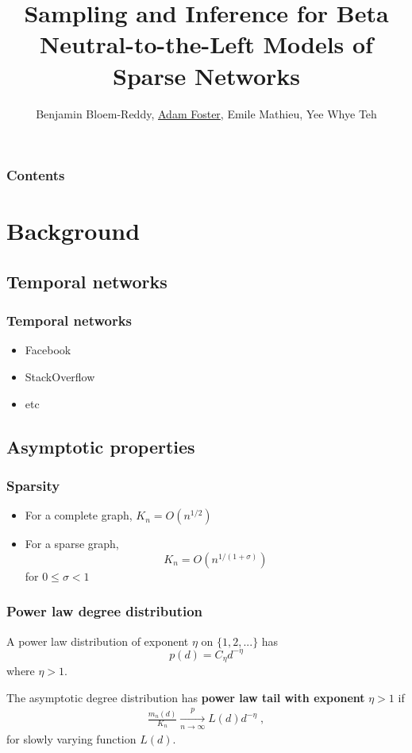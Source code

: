 \documentclass[final,hyperref={pdfpagelabels=false},noamsthm]{beamer}
\title{Sampling and Inference for Beta Neutral-to-the-Left Models of Sparse Networks} %
\author{Benjamin Bloem-Reddy, \underline{Adam Foster}, Emile Mathieu, Yee Whye Teh }
\institute{Department of Statistics, University of Oxford}
\begin{document}
	
\begin{frame}[plain]
	\titlepage
\end{frame}

\begin{frame}
	\frametitle{Contents}
	\tableofcontents
\end{frame}

\section{Background}
\subsection{Temporal networks}

\begin{frame}
	\frametitle{Temporal networks}
	\begin{itemize}
		\item Facebook
		\item StackOverflow
		\item etc
	\end{itemize}
\end{frame}


\subsection{Asymptotic properties}
\begin{frame}
	\frametitle{Sparsity}
	\begin{itemize}
		\item For a complete graph, $K_n = O(n^{1/2})$
		\item For a sparse graph,
		\begin{equation}
			K_n = O(n^{1/(1+\sigma)})
		\end{equation}
		for $0 \le \sigma < 1$
	\end{itemize}
\end{frame}

\begin{frame}
	\frametitle{Power law degree distribution}
	A power law distribution of exponent $\eta$ on $\{1, 2, ...\}$ has
	\begin{equation}
	p(d) = C_\eta d^{-\eta} 
	\end{equation}
	where $\eta > 1$.
	
	\pause
	The asymptotic degree distribution has \textbf{power law tail with exponent} $\eta > 1$ if
	\begin{align} 
	\label{eq:plaw}
	\frac{m_{n}(d)}{K_n} \xrightarrow[n\to\infty]{p} L(d)d^{-\eta} \;,
	\end{align}
	for slowly varying function $L(d)$.
\end{frame}
\end{document}
